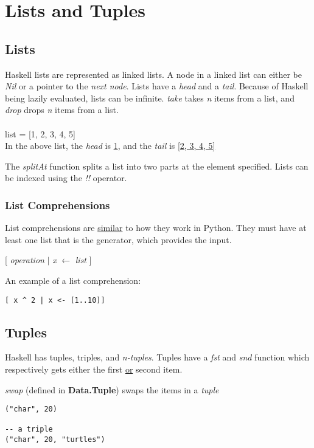 \section{Lists and Tuples}

\subsection{Lists}
Haskell lists are represented as linked lists.
A node in a linked list can either be \emph{Nil} or a pointer to the \emph{next node}. Lists have a \emph{head} and a \emph{tail}. Because of Haskell being lazily evaluated, lists can be infinite. \emph{take} takes \emph{n} items from a list, and \emph{drop} drops \emph{n} items from a list.\\
\\
list = [1, 2, 3, 4, 5]\\
In the above list, the \emph{head} is \underline{1}, and the \emph{tail} is \underline{[2, 3, 4, 5]}

The \emph{splitAt} function splits a list into two parts at the element specified.
Lists can be indexed using the \emph{!!} operator.

\subsubsection{List Comprehensions}
List comprehensions are \underline{similar} to how they work in Python.
They must have at least one list that is the generator, which provides
the input.

[ \emph{operation} $\vert$ \emph{x} $\leftarrow$ \emph{list} ]

An example of a list comprehension:
\begin{verbatim}
[ x ^ 2 | x <- [1..10]]
\end{verbatim}

\subsection{Tuples}
Haskell has tuples, triples, and \emph{n-tuples}. Tuples have a \emph{fst} and \emph{snd} function which
respectively gets either the first \underline{or} second item. 

\emph{swap} (defined in \textbf{Data.Tuple}) swaps the items in a \emph{tuple}

\begin{lstlisting}
("char", 20)

-- a triple
("char", 20, "turtles")
\end{lstlisting}